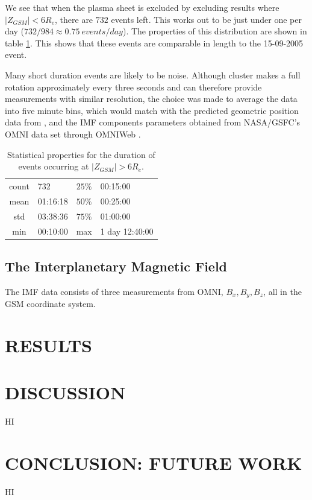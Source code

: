 \documentclass[12pt]{article}
\begin{document}
We see that when the plasma sheet is excluded by excluding results where $|Z_{GSM}|<6R_e$, there are $732$ events left. This works out to be just under one per day ($732/984\approx0.75\ events/day$). The properties of this distribution are shown in table \ref{tab:event_durn}. This shows that these events are comparable in length to the 15-09-2005 event.

Many short duration events are likely to be noise. Although cluster makes a full rotation approximately every three seconds and can therefore provide measurements with similar resolution, the choice was made to average the data into five minute bins, which would match with the predicted geometric position data from \cite{cdms}, and the IMF components parameters obtained from NASA/GSFC's OMNI data set through OMNIWeb \cite{omniData}.

\begin{table}[]
    \begin{minipage}[c]{0.57\textwidth}
        \centering
        \begin{tabular}{||c|l||c|l||}
            \hline
            count & 732 & $25\%$ & 00:15:00 \\
            mean & 01:16:18 & $50\%$ & 00:25:00 \\
            std & 03:38:36 & $75\%$ & 01:00:00 \\
            min & 00:10:00 & max & 1 day 12:40:00 \\
            \hline
        \end{tabular}
    \end{minipage}\hfill
    \begin{minipage}[c]{0.4\textwidth}
        \caption{Statistical properties for the duration of events occurring at $|Z_{GSM}|>6R_e$.}
        \label{tab:event_durn}
    \end{minipage}
\end{table}

\subsection{The Interplanetary Magnetic Field}
The IMF data consists of three measurements from OMNI, $B_x, B_y, B_z$, all in the GSM coordinate system. 

\section{RESULTS}

\section{DISCUSSION}
HI

\section{CONCLUSION: FUTURE WORK}
HI \\

\printbibliography
\end{document}
